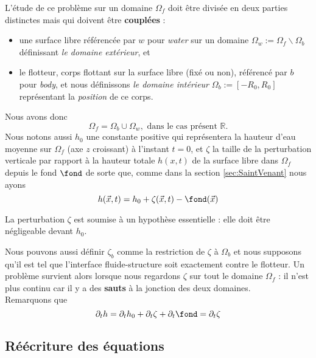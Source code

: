 \noindent L'étude de ce problème sur un domaine $\Omega_f$ doit être divisée en deux parties distinctes mais qui doivent être \textbf{couplées} : 
\begin{itemize}
	\item une surface libre référencée par $w$ pour \textit{water} sur un domaine $\Omega_w := \Omega_f\backslash \Omega_b$ définissant \textit{le domaine extérieur}, et 
	\item le flotteur, corps flottant sur la surface libre (fixé ou non), référencé par $b$ pour \textit{body}, et nous définissons \textit{le domaine intérieur} $\Omega_b := [-R_0, R_0]$ représentant la \textit{position} de ce corps.\\
\end{itemize}
Nous avons donc \[\Omega_f = \Omega_b \cup \Omega_w,\text{ dans le cas présent $\mathbb{R}$.}\]
Nous notons aussi $h_0$ une constante positive qui représentera la hauteur d'eau moyenne sur $\Omega_f$ (axe $z$ croissant) à l'instant $t=0$, et $\zeta$ la taille de la perturbation verticale par rapport à la hauteur totale $h(x, t)$ de la surface libre dans $\Omega_f$ depuis le fond $\fond$ de sorte que, comme dans la section \ref{sec:SaintVenant} nous ayons
\begin{equation}
	h(\vec{x}, t) = h_0 + \zeta(\vec{x}, t) - \fond (\vec{x}) \label{eq:deep}
\end{equation}\vspace{-5mm}
\begin{refe}
La perturbation $\zeta$ est soumise à un hypothèse essentielle : elle doit être négligeable devant $h_0$.
\end{refe}
Nous pouvons aussi définir $\zeta_b$ comme la restriction de $\zeta$ à $\Omega_b$ et nous supposons qu'il est tel que l'interface fluide-structure soit exactement contre le flotteur. Un problème survient alors lorsque nous regardons $\zeta$ sur tout le domaine $\Omega_f$ : il n'est plus continu car il y a des \textbf{sauts} à la jonction des deux domaines.\\
Remarquons que 
\begin{equation}
	\partial_t h = \partial_t h_0 + \partial_t \zeta + \partial_t \fond = \partial_t \zeta \label{eq:der_t_h}
\end{equation}
\subsection{Réécriture des équations}
